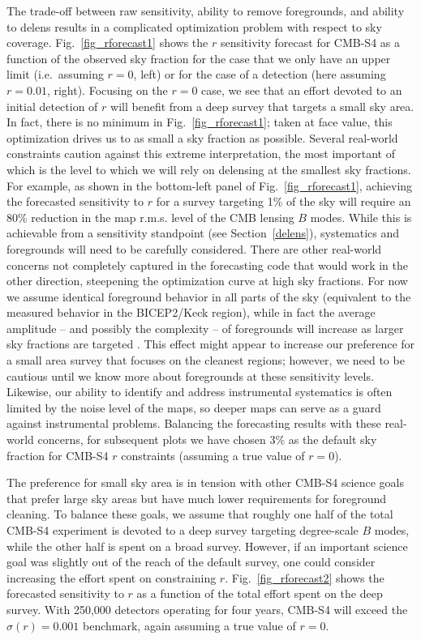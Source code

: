 The trade-off between raw sensitivity, ability to remove foregrounds, and ability to delens results in a complicated optimization problem with respect to sky coverage.
Fig.~\ref{fig_rforecast1} shows the $r$ sensitivity forecast for CMB-S4 as a function of the observed sky fraction for the case that we only have an upper limit (i.e.\ assuming $r=0$, left) or for the case of a detection (here assuming $r=0.01$, right).
Focusing on the $r=0$ case, we see that an effort devoted to an initial detection of $r$ will benefit from a deep survey that targets a small sky area.
In fact, there is no minimum in Fig.~\ref{fig_rforecast1}; taken at face value, this optimization drives us to as small a sky fraction as possible. 
Several real-world constraints caution against this extreme interpretation, the most important of which is the level to which we will rely on delensing at the smallest sky fractions.
For example, as shown in the bottom-left panel of Fig.~\ref{fig_rforecast1}, achieving the forecasted sensitivity to $r$ for a survey targeting 1\% of the sky will require an 80\% reduction in the map r.m.s. level of the CMB lensing $B$ modes. 
While this is achievable from a sensitivity standpoint (see Section~\ref{delens}), systematics and foregrounds will need to be carefully considered.
There are other real-world concerns not completely captured in the forecasting code that would work in the other direction, steepening the optimization curve at high sky fractions.
For now we assume identical foreground behavior in all parts of the sky (equivalent to the measured behavior in the BICEP2/Keck region), while in fact the average amplitude -- and possibly the complexity -- of foregrounds will increase as larger sky fractions are targeted \cite{PlanckIntXXX,PlanckIntL}.
This effect might appear to increase our preference for a small area survey that focuses on the cleanest regions; however, we need to be cautious until we know more about foregrounds at these sensitivity levels.
Likewise, our ability to identify and address instrumental systematics is often limited by the noise level of the maps, so deeper maps can serve as a guard against instrumental problems.
Balancing the forecasting results with these real-world concerns, for subsequent plots we have chosen 3\% as the default sky fraction for CMB-S4 $r$ constraints (assuming a true value of $r=0$).

The preference for small sky area is in tension with other CMB-S4 science goals that prefer large sky areas but have much lower requirements for foreground cleaning.
To balance these goals, we assume that roughly one half of the total CMB-S4 experiment is devoted to a deep survey targeting degree-scale $B$ modes, while the other half is spent on a broad survey.
However, if an important science goal was slightly out of the reach of the default survey, one could consider increasing the effort spent on constraining $r$.
Fig.~\ref{fig_rforecast2} shows the forecasted sensitivity to $r$ as a function of the total effort spent on the deep survey.
With 250,000 detectors operating for four years, CMB-S4 will exceed the $\sigma(r)=0.001$ benchmark, again assuming a true value of $r=0$.

